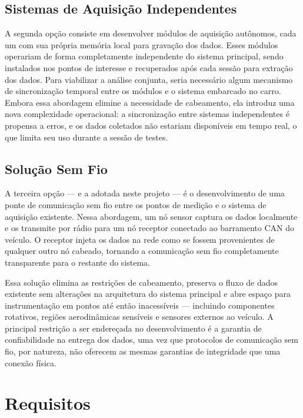 \documentclass{article}
\begin{document}
    \subsection{Sistemas de Aquisição Independentes}

    A segunda opção consiste em desenvolver módulos de aquisição autônomos, cada
    um com sua própria memória local para gravação dos dados. Esses módulos operariam
    de forma completamente independente do sistema principal, sendo instalados
    nos pontos de interesse e recuperados após cada sessão para extração dos
    dados. Para viabilizar a análise conjunta, seria necessário algum mecanismo
    de sincronização temporal entre os módulos e o sistema embarcado no carro. Embora
    essa abordagem elimine a necessidade de cabeamento, ela introduz uma nova
    complexidade operacional: a sincronização entre sistemas independentes é propensa
    a erros, e os dados coletados não estariam disponíveis em tempo real, o que limita
    seu uso durante a sessão de testes.

    \subsection{Solução Sem Fio}

    A terceira opção — e a adotada neste projeto — é o desenvolvimento de uma
    ponte de comunicação sem fio entre os pontos de medição e o sistema de
    aquisição existente. Nessa abordagem, um nó sensor captura os dados
    localmente e os transmite por rádio para um nó receptor conectado ao
    barramento CAN do veículo. O receptor injeta os dados na rede como se fossem
    provenientes de qualquer outro nó cabeado, tornando a comunicação sem fio
    completamente transparente para o restante do sistema.

    Essa solução elimina as restrições de cabeamento, preserva o fluxo de dados existente
    sem alterações na arquitetura do sistema principal e abre espaço para instrumentação
    em pontos até então inacessíveis — incluindo componentes rotativos, regiões
    aerodinâmicas sensíveis e sensores externos ao veículo. A principal restrição
    a ser endereçada no desenvolvimento é a garantia de confiabilidade na entrega
    dos dados, uma vez que protocolos de comunicação sem fio, por natureza, não
    oferecem as mesmas garantias de integridade que uma conexão física.

    \section{Requisitos}
\end{document}
